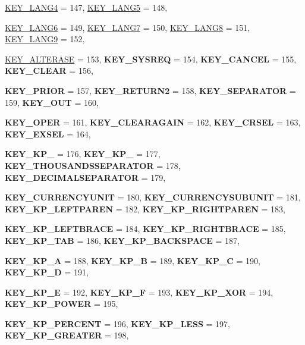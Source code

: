 \begin{DoxyCompactItemize}
\hyperlink{classphys_1_1MetaCode_a3e501cbb5bf0f6f1fdb7211465bda8d8a97d692fa1be298b30c6e338020eca59c}{KEY\_\-LANG4} =  147, 
\hyperlink{classphys_1_1MetaCode_a3e501cbb5bf0f6f1fdb7211465bda8d8a2cc895ea487f902ad676c0ae358ce38f}{KEY\_\-LANG5} =  148, 
\par
\hyperlink{classphys_1_1MetaCode_a3e501cbb5bf0f6f1fdb7211465bda8d8a379a876207b4223398f3f89629ccd8fd}{KEY\_\-LANG6} =  149, 
\hyperlink{classphys_1_1MetaCode_a3e501cbb5bf0f6f1fdb7211465bda8d8a7c94e225ee1f3b6e3518a455070c78f8}{KEY\_\-LANG7} =  150, 
\hyperlink{classphys_1_1MetaCode_a3e501cbb5bf0f6f1fdb7211465bda8d8a750888e8ab0ea97e8daa1dabe90cd3e4}{KEY\_\-LANG8} =  151, 
\hyperlink{classphys_1_1MetaCode_a3e501cbb5bf0f6f1fdb7211465bda8d8a64d57026c86f63ddd54c3d08a72cde01}{KEY\_\-LANG9} =  152, 
\par
\hyperlink{classphys_1_1MetaCode_a3e501cbb5bf0f6f1fdb7211465bda8d8a49842de0ed4c70353663e255b327284b}{KEY\_\-ALTERASE} =  153, 
{\bfseries KEY\_\-SYSREQ} =  154, 
{\bfseries KEY\_\-CANCEL} =  155, 
{\bfseries KEY\_\-CLEAR} =  156, 
\par
{\bfseries KEY\_\-PRIOR} =  157, 
{\bfseries KEY\_\-RETURN2} =  158, 
{\bfseries KEY\_\-SEPARATOR} =  159, 
{\bfseries KEY\_\-OUT} =  160, 
\par
{\bfseries KEY\_\-OPER} =  161, 
{\bfseries KEY\_\-CLEARAGAIN} =  162, 
{\bfseries KEY\_\-CRSEL} =  163, 
{\bfseries KEY\_\-EXSEL} =  164, 
\par
{\bfseries KEY\_\-KP\_} =  176, 
{\bfseries KEY\_\-KP\_} =  177, 
{\bfseries KEY\_\-THOUSANDSSEPARATOR} =  178, 
{\bfseries KEY\_\-DECIMALSEPARATOR} =  179, 
\par
{\bfseries KEY\_\-CURRENCYUNIT} =  180, 
{\bfseries KEY\_\-CURRENCYSUBUNIT} =  181, 
{\bfseries KEY\_\-KP\_\-LEFTPAREN} =  182, 
{\bfseries KEY\_\-KP\_\-RIGHTPAREN} =  183, 
\par
{\bfseries KEY\_\-KP\_\-LEFTBRACE} =  184, 
{\bfseries KEY\_\-KP\_\-RIGHTBRACE} =  185, 
{\bfseries KEY\_\-KP\_\-TAB} =  186, 
{\bfseries KEY\_\-KP\_\-BACKSPACE} =  187, 
\par
{\bfseries KEY\_\-KP\_\-A} =  188, 
{\bfseries KEY\_\-KP\_\-B} =  189, 
{\bfseries KEY\_\-KP\_\-C} =  190, 
{\bfseries KEY\_\-KP\_\-D} =  191, 
\par
{\bfseries KEY\_\-KP\_\-E} =  192, 
{\bfseries KEY\_\-KP\_\-F} =  193, 
{\bfseries KEY\_\-KP\_\-XOR} =  194, 
{\bfseries KEY\_\-KP\_\-POWER} =  195, 
\par
{\bfseries KEY\_\-KP\_\-PERCENT} =  196, 
{\bfseries KEY\_\-KP\_\-LESS} =  197, 
{\bfseries KEY\_\-KP\_\-GREATER} =  198, 

\end{DoxyCompactItemize}
